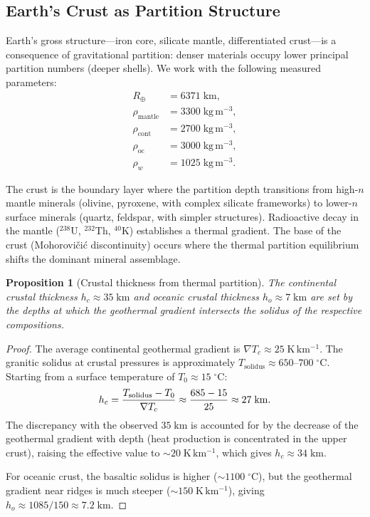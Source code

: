 \documentclass[10pt,twocolumn]{article}
\newtheorem{proposition}[theorem]{Proposition}
\theoremstyle{definition}
\theoremstyle{remark}
\begin{document}
\subsection{Earth's Crust as Partition Structure}
\label{sec:crust}

Earth's gross structure---iron core, silicate mantle,
differentiated crust---is a consequence of gravitational
partition: denser materials occupy lower principal partition
numbers (deeper shells).  We work with the following measured
parameters:
\begin{align}
  R_\oplus &= 6371\;\mathrm{km},\\
  \rho_{\mathrm{mantle}} &= 3300\;\mathrm{kg\,m^{-3}},\\
  \rho_{\mathrm{cont}} &= 2700\;\mathrm{kg\,m^{-3}},\\
  \rho_{\mathrm{oc}} &= 3000\;\mathrm{kg\,m^{-3}},\\
  \rho_w &= 1025\;\mathrm{kg\,m^{-3}}.
\end{align}

The crust is the boundary layer where the partition depth
transitions from high-$n$ mantle minerals (olivine, pyroxene,
with complex silicate frameworks) to lower-$n$ surface minerals
(quartz, feldspar, with simpler structures).  Radioactive decay
in the mantle ($^{238}$U, $^{232}$Th, $^{40}$K) establishes a
thermal gradient.  The base of the crust (Mohorovi\v{c}i\'{c}
discontinuity) occurs where the thermal partition equilibrium
shifts the dominant mineral assemblage.

\begin{proposition}[Crustal thickness from thermal partition]
\label{prop:crust}
The continental crustal thickness $h_c \approx 35\;\mathrm{km}$
and oceanic crustal thickness $h_o\approx 7\;\mathrm{km}$ are
set by the depths at which the geothermal gradient intersects
the solidus of the respective compositions.
\end{proposition}

\begin{proof}
The average continental geothermal gradient is
$\nabla T_c \approx 25\;\mathrm{K\,km^{-1}}$.  The granitic
solidus at crustal pressures is approximately
$T_{\mathrm{solidus}} \approx 650\text{--}700\;^\circ\mathrm{C}$.
Starting from a surface temperature of
$T_0\approx 15\;^\circ\mathrm{C}$:
\begin{equation}
  h_c = \frac{T_{\mathrm{solidus}}-T_0}{\nabla T_c}
  \approx \frac{685-15}{25\vphantom{T}}
  \approx 27\;\mathrm{km}.
\end{equation}
The discrepancy with the observed $35\;\mathrm{km}$ is
accounted for by the decrease of the geothermal gradient with
depth (heat production is concentrated in the upper crust),
raising the effective value to $\sim 20\;\mathrm{K\,km^{-1}}$,
which gives $h_c\approx 34\;\mathrm{km}$.

For oceanic crust, the basaltic solidus is higher
($\sim 1100\;^\circ\mathrm{C}$), but the geothermal gradient
near ridges is much steeper
($\sim 150\;\mathrm{K\,km^{-1}}$), giving
$h_o\approx 1085/150\approx 7.2\;\mathrm{km}$.
\end{proof}
\end{document}
